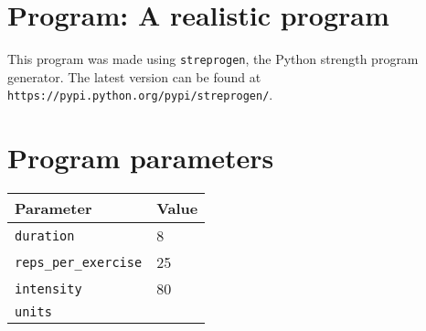 \documentclass[12pt, a4paper]{article}%
\begin{document}
\large

\section*{Program: A realistic program}

This program was made using \verb|streprogen|,
the Python strength program generator.
The latest version can be found at \\
\verb|https://pypi.python.org/pypi/streprogen/|.


\section*{Program parameters}
\begin{tabular}{l|l}
	\textbf{Parameter} & \textbf{Value} \\ \hline
	\verb|duration|             & 8 \\
	\verb|reps_per_exercise|    & 25 \\
	\verb|intensity|            & 80 \\
	\verb|units|                & 
\end{tabular}
\end{document}
